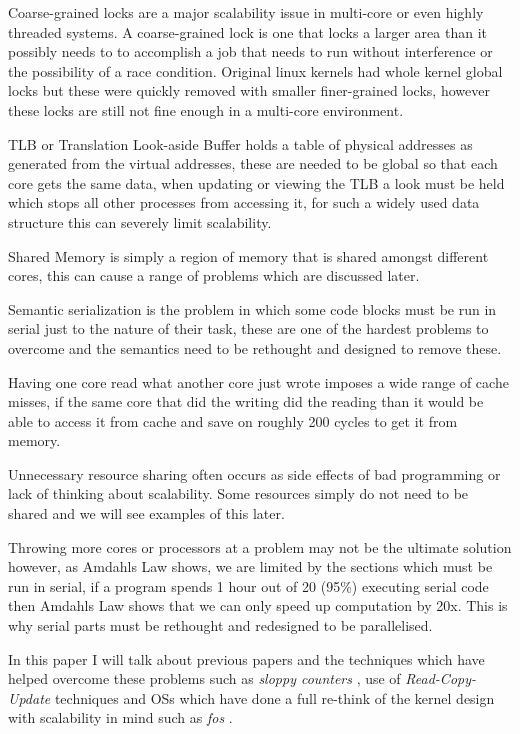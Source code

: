 \documentclass[journal]{IEEEtran}
\begin{document}
Coarse-grained locks are a major scalability issue in multi-core or even highly threaded systems. A coarse-grained lock is one that locks a larger area than it possibly needs to to accomplish a job that needs to run without interference or the possibility of a race condition. Original linux kernels had whole kernel global locks but these were quickly removed with smaller finer-grained locks, however these locks are still not fine enough in a multi-core environment.

TLB or Translation Look-aside Buffer holds a table of physical addresses as generated from the virtual addresses, these are needed to be global so that each core gets the same data, when updating or viewing the TLB a look must be held which stops all other processes from accessing it, for such a widely used data structure this can severely limit scalability.

Shared Memory is simply a region of memory that is shared amongst different cores, this can cause a range of problems which are discussed later.

Semantic serialization is the problem in which some code blocks must be run in serial just to the nature of their task, these are one of the hardest problems to overcome and the semantics need to be rethought and designed to remove these.

Having one core read what another core just wrote imposes a wide range of cache misses, if the same core that did the writing did the reading than it would be able to access it from cache and save on roughly 200 cycles to get it from memory.

Unnecessary resource sharing often occurs as side effects of bad programming or lack of thinking about scalability. Some resources simply do not need to be shared and we will see examples of this later.

Throwing more cores or processors at a problem may not be the ultimate solution however, as Amdahls Law \cite{Amdahl} shows, we are limited by the sections which must be run in serial, if a program spends 1 hour out of 20 (95\%) executing serial code then Amdahls Law shows that we can only speed up computation by 20x. This is why serial parts must be rethought and redesigned to be parallelised.

In this paper I will talk about previous papers and the techniques which have helped overcome these problems such as \emph{sloppy counters} \cite{sloppy-counters}, use of \emph{Read-Copy-Update} \cite{RCU} techniques and OSs which have done a full re-think of the kernel design with scalability in mind such as \emph{fos} \cite{fos}.
\end{document}
